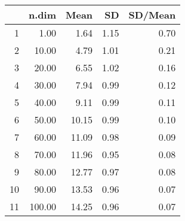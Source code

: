 \begin{table}[ht]
\centering
\begin{tabular}{rrrrr}
  \hline
 & n.dim & Mean & SD & SD/Mean \\ 
  \hline
1 & 1.00 & 1.64 & 1.15 & 0.70 \\ 
  2 & 10.00 & 4.79 & 1.01 & 0.21 \\ 
  3 & 20.00 & 6.55 & 1.02 & 0.16 \\ 
  4 & 30.00 & 7.94 & 0.99 & 0.12 \\ 
  5 & 40.00 & 9.11 & 0.99 & 0.11 \\ 
  6 & 50.00 & 10.15 & 0.99 & 0.10 \\ 
  7 & 60.00 & 11.09 & 0.98 & 0.09 \\ 
  8 & 70.00 & 11.96 & 0.95 & 0.08 \\ 
  9 & 80.00 & 12.77 & 0.97 & 0.08 \\ 
  10 & 90.00 & 13.53 & 0.96 & 0.07 \\ 
  11 & 100.00 & 14.25 & 0.96 & 0.07 \\ 
   \hline
\end{tabular}
\end{table}
